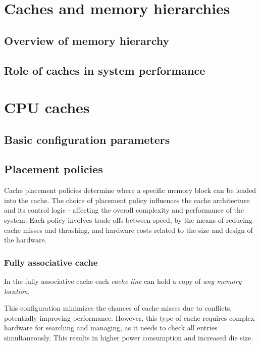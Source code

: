 %

\section{Caches and memory hierarchies}


\subsection{Overview of memory hierarchy}
\subsection{Role of caches in system performance}
%

\section{CPU caches}
\subsection{Basic configuration parameters}
%
\subsection{Placement policies}
Cache placement policies determine where a specific memory block can be loaded into
the cache. The choice of placement policy influences the cache architecture and
its control logic - affecting the overall complexity and performance of the system.
Each policy involves trade-offs between speed, by the means of reducing cache misses and
thrashing, and hardware costs related to the size and design of the hardware.


\subsubsection{Fully associative cache}
In the fully associative cache each \textit{cache line} can hold a copy of
\textit{any memory location}.

\noindent This configuration minimizes the chances of cache misses due to conflicts,
potentially improving performance. However, this type of cache requires
complex hardware for searching and managing, as it needs to check all entries
simultaneously. This results in higher power consumption and increased die size.

